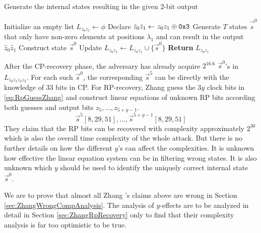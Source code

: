 \begin{algorithm}[htbp]
	\caption{Generate the internal states resulting in the given 2-bit output} \label{alg:getLz0z1}
	\begin{algorithmic}[1]
\State Initialize an empty list $L_{z_0z_1}\leftarrow \phi$
\State Declare $\hat{z}_0\hat{z}_1\leftarrow z_0z_1\oplus {\tt 0x3}$
\State Generate $T$ states $\vec{\hat{s}}^0$ that only have non-zero elements at positions $\lambda_1$ and can result in the output $\hat{z}_0\hat{z}_1$
\State Construct state $\vec{s}^0$
\State Update $L_{z_0z_1}\leftarrow L_{z_0z_1}\cup \{\vec{s}^0\}$
\EndIf
\EndFor
\State \textbf{Return} $L_{z_0z_1}$
		\EndProcedure
	\end{algorithmic}
\end{algorithm}



After the CP-recovery phase, the adversary has already acquire $2^{16.6}$ $\vec{s}^0$'s in $L_{z_0z_1z_2z_3}$.
For each such $\vec{s}^0$, the corresponding $\vec{s}^5$ can be directly with the knowledge of 33 bits in CP.
For RP-recovery, Zhang \etal guess the $3y$ clock bits in \eqref{eq:RpGuessZhang} and construct linear equations of unknown RP bits according both guesses and output bits $z_5,\ldots, z_{5+y-1}$.
\begin{equation}\label{eq:RpGuessZhang}
  \vec{s}^5[8,29,51], \ldots, \vec {s}^{5+y-1}[8,29,51]
\end{equation}
They claim that the RP bits can be recovered with complexity approximately $2^{30}$ which is also the overall time complexity of the whole attack.
But there is no further details on how the different $y$'s can affect the complexities. 
It is unknown how effective the linear equation system can be in filtering wrong states. 
It is also unknown which $y$ should be used to identify the uniquely correct internal state $\vec{s}^0$.
 
We are to prove that almost all Zhang \etal's claims above are wrong in Section \ref{sec:ZhangWrongCompAnalysis}.
The analysis of $y$-effects are to be analyzed in detail in Section \ref{sec:ZhangRpRecovery} only to find that their complexity analysis is far too optimistic to be true.

